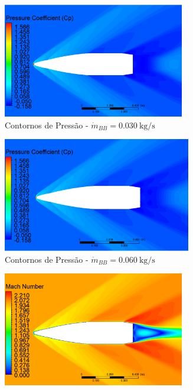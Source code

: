 \begin{figure}[!ht]
	\centering
	\begin{subfigure}[b]{0.47\textwidth}
        \centering
        \includegraphics[height=5cm,width=\textwidth]{contorno-pressao-2306K-vazao-0030-2pol.png}
        \caption{Contornos de Pressão - $\Dot{m}_{BB} = \qty{0,030}{\kilogram\per\second}$}
        \label{fig:contorno-pressao-bb-2pol-vazao-0030}
    \end{subfigure}
    \hfill
    \begin{subfigure}[b]{0.47\textwidth}
        \centering
        \includegraphics[height=5cm,width=\textwidth]{contorno-pressao-2306K-vazao-0060-2pol.png}
        \caption{Contornos de Pressão - $\Dot{m}_{BB} = \qty{0,060}{\kilogram\per\second}$}
        \label{fig:contorno-pressao-bb-2pol-vazao-0060}
    \end{subfigure}
    \hfill
    \begin{subfigure}[b]{0.47\textwidth}
        \centering
        \includegraphics[height=5cm,width=\textwidth]{contorno-velocidade-2306K-vazao-0030-2pol.png}

\end{subfigure}
\end{figure}
